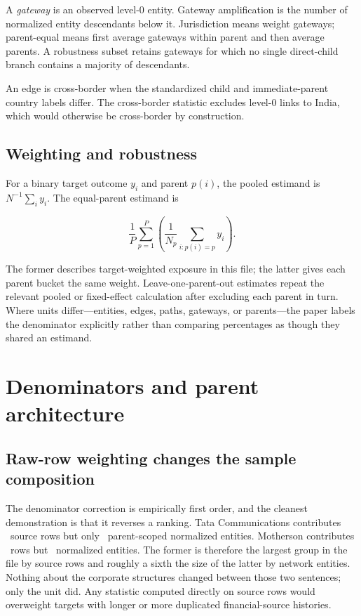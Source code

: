 \documentclass[11pt]{article}
\begin{document}
A \emph{gateway} is an observed level-0 entity. Gateway amplification is the
number of normalized entity descendants below it. Jurisdiction means weight
gateways; parent-equal means first average gateways within parent and then
average parents. A robustness subset retains gateways for which no single
direct-child branch contains a majority of descendants.

An edge is cross-border when the standardized child and immediate-parent
country labels differ. The cross-border statistic excludes level-0 links to
India, which would otherwise be cross-border by construction.

\subsection{Weighting and robustness}

For a binary target outcome $y_i$ and parent $p(i)$, the pooled estimand is
$N^{-1}\sum_i y_i$. The equal-parent estimand is

\[
  \frac{1}{P}\sum_{p=1}^{P}\left(\frac{1}{N_p}\sum_{i:p(i)=p} y_i\right).
\]

The former describes target-weighted exposure in this file; the latter gives
each parent bucket the same weight. Leave-one-parent-out estimates repeat the
relevant pooled or fixed-effect calculation after excluding each parent in
turn. Where units differ---entities, edges, paths, gateways, or parents---the
paper labels the denominator explicitly rather than comparing percentages as
though they shared an estimand.

\section{Denominators and parent architecture}
\label{sec:architecture}

\subsection{Raw-row weighting changes the sample composition}

The denominator correction is empirically first order, and the cleanest
demonstration is that it reverses a ranking. Tata Communications contributes
\TataCommRawRows\ source rows but only \TataCommEntities\ parent-scoped
normalized entities. Motherson contributes \MothersonRawRows\ rows but
\MothersonEntities\ normalized entities. The former is therefore the largest
group in the file by source rows and roughly a sixth the size of the latter by
network entities. Nothing about the corporate structures changed between those
two sentences; only the unit did. Any statistic
computed directly on source rows would overweight targets with longer or more
duplicated financial-source histories.
\end{document}
